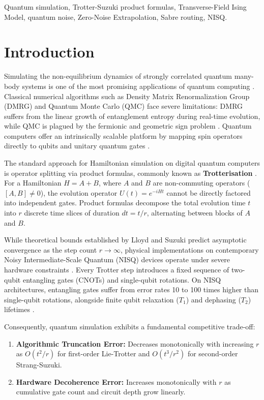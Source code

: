 \documentclass[conference]{IEEEtran}
\begin{document}
\begin{IEEEkeywords}
Quantum simulation, Trotter-Suzuki product formulas, Transverse-Field Ising Model, quantum noise, Zero-Noise Extrapolation, Sabre routing, NISQ.
\end{IEEEkeywords}

\section{Introduction}
Simulating the non-equilibrium dynamics of strongly correlated quantum many-body systems is one of the most promising applications of quantum computing \cite{georgescu2014}. Classical numerical algorithms such as Density Matrix Renormalization Group (DMRG) and Quantum Monte Carlo (QMC) face severe limitations: DMRG suffers from the linear growth of entanglement entropy during real-time evolution, while QMC is plagued by the fermionic and geometric sign problem \cite{white1992}. Quantum computers offer an intrinsically scalable platform by mapping spin operators directly to qubits and unitary quantum gates \cite{feynman1982}.

The standard approach for Hamiltonian simulation on digital quantum computers is operator splitting via product formulas, commonly known as \textbf{Trotterisation} \cite{lloyd1996, suzuki1991}. For a Hamiltonian $H = A + B$, where $A$ and $B$ are non-commuting operators ($[A, B] \ne 0$), the evolution operator $U(t) = e^{-i H t}$ cannot be directly factored into independent gates. Product formulas decompose the total evolution time $t$ into $r$ discrete time slices of duration $dt = t/r$, alternating between blocks of $A$ and $B$.

While theoretical bounds established by Lloyd \cite{lloyd1996} and Suzuki \cite{suzuki1991} predict asymptotic convergence as the step count $r \to \infty$, physical implementations on contemporary Noisy Intermediate-Scale Quantum (NISQ) devices operate under severe hardware constraints \cite{preskill2018}. Every Trotter step introduces a fixed sequence of two-qubit entangling gates (CNOTs) and single-qubit rotations. On NISQ architectures, entangling gates suffer from error rates 10 to 100 times higher than single-qubit rotations, alongside finite qubit relaxation ($T_1$) and dephasing ($T_2$) lifetimes \cite{krantz2019}.

Consequently, quantum simulation exhibits a fundamental competitive trade-off:
\begin{enumerate}
    \item \textbf{Algorithmic Truncation Error:} Decreases monotonically with increasing $r$ as $O(t^2/r)$ for first-order Lie-Trotter and $O(t^3/r^2)$ for second-order Strang-Suzuki.
    \item \textbf{Hardware Decoherence Error:} Increases monotonically with $r$ as cumulative gate count and circuit depth grow linearly.
\end{enumerate}
\end{document}
